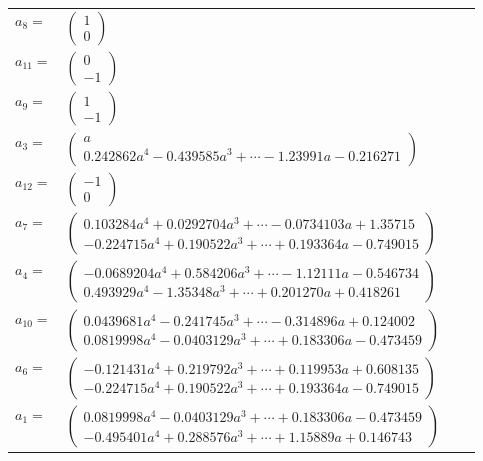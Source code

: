 \documentclass[1p]{elsarticle_modified}
\theoremstyle{definition}
\begin{document}
\begin{tabular}{m{7pt} m{180pt} m{7pt} m{180pt} }
\flushright $a_{8}=$&$\begin{pmatrix}1\\0\end{pmatrix}$ \\
\flushright $a_{11}=$&$\begin{pmatrix}0\\-1\end{pmatrix}$ \\
\flushright $a_{9}=$&$\begin{pmatrix}1\\-1\end{pmatrix}$ \\
\flushright $a_{3}=$&$\begin{pmatrix}a\\0.242862 a^{4}-0.439585 a^{3}+\cdots-1.23991 a-0.216271\end{pmatrix}$ \\
\flushright $a_{12}=$&$\begin{pmatrix}-1\\0\end{pmatrix}$ \\
\flushright $a_{7}=$&$\begin{pmatrix}0.103284 a^{4}+0.0292704 a^{3}+\cdots-0.0734103 a+1.35715\\-0.224715 a^{4}+0.190522 a^{3}+\cdots+0.193364 a-0.749015\end{pmatrix}$ \\
\flushright $a_{4}=$&$\begin{pmatrix}-0.0689204 a^{4}+0.584206 a^{3}+\cdots-1.12111 a-0.546734\\0.493929 a^{4}-1.35348 a^{3}+\cdots+0.201270 a+0.418261\end{pmatrix}$ \\
\flushright $a_{10}=$&$\begin{pmatrix}0.0439681 a^{4}-0.241745 a^{3}+\cdots-0.314896 a+0.124002\\0.0819998 a^{4}-0.0403129 a^{3}+\cdots+0.183306 a-0.473459\end{pmatrix}$ \\
\flushright $a_{6}=$&$\begin{pmatrix}-0.121431 a^{4}+0.219792 a^{3}+\cdots+0.119953 a+0.608135\\-0.224715 a^{4}+0.190522 a^{3}+\cdots+0.193364 a-0.749015\end{pmatrix}$ \\
\flushright $a_{1}=$&$\begin{pmatrix}0.0819998 a^{4}-0.0403129 a^{3}+\cdots+0.183306 a-0.473459\\-0.495401 a^{4}+0.288576 a^{3}+\cdots+1.15889 a+0.146743\end{pmatrix}$ \\

\end{tabular}
\end{document}
